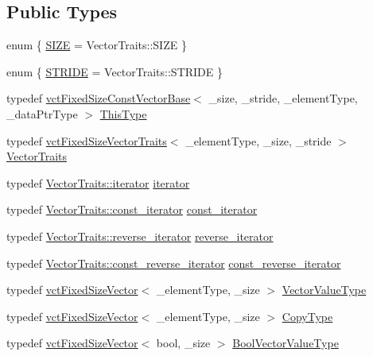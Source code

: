 \subsection*{Public Types}
\begin{DoxyCompactItemize}
\item 
enum \{ \hyperlink{classvct_fixed_size_const_vector_base_abce8a0d5a26d7343df60ea28ccf38626ac440f88d775ff77d03e1a484a213dcfe}{S\+I\+Z\+E} = Vector\+Traits\+:\+:S\+I\+Z\+E
 \}
\item 
enum \{ \hyperlink{classvct_fixed_size_const_vector_base_a8b833ecc64bf9196c1a89a56d6f11ebbaddc2fa94f972a3bf4df3a35bec4bdc48}{S\+T\+R\+I\+D\+E} = Vector\+Traits\+:\+:S\+T\+R\+I\+D\+E
 \}
\item 
typedef \hyperlink{classvct_fixed_size_const_vector_base}{vct\+Fixed\+Size\+Const\+Vector\+Base}$<$ \+\_\+size, \+\_\+stride, \+\_\+element\+Type, \+\_\+data\+Ptr\+Type $>$ \hyperlink{classvct_fixed_size_const_vector_base_a071063bc4fa43112cc287b2dbef53180}{This\+Type}
\item 
typedef \hyperlink{classvct_fixed_size_vector_traits}{vct\+Fixed\+Size\+Vector\+Traits}$<$ \+\_\+element\+Type, \+\_\+size, \+\_\+stride $>$ \hyperlink{classvct_fixed_size_const_vector_base_ac47f6db624303dee621bca2ec51aa75e}{Vector\+Traits}
\item 
typedef \hyperlink{classvct_fixed_size_vector_traits_a4c4cff693ac7f81edfb240a208506309}{Vector\+Traits\+::iterator} \hyperlink{classvct_fixed_size_const_vector_base_ad0ba9b13bb2515695b4e44290bdbaa5d}{iterator}
\item 
typedef \hyperlink{classvct_fixed_size_vector_traits_a9c7e38590e4a27350095e89a84dc0d09}{Vector\+Traits\+::const\+\_\+iterator} \hyperlink{classvct_fixed_size_const_vector_base_abc547e0542bb6f7d92876a56c7ea5cdc}{const\+\_\+iterator}
\item 
typedef \hyperlink{classvct_fixed_size_vector_traits_a46a61657ee7bece7277e0b59c4e0ea41}{Vector\+Traits\+::reverse\+\_\+iterator} \hyperlink{classvct_fixed_size_const_vector_base_ae22e8ced509e202d00620f384ac3a5b2}{reverse\+\_\+iterator}
\item 
typedef \hyperlink{classvct_fixed_size_vector_traits_a66365350e5fae26c9cf29a3ce0bb4a60}{Vector\+Traits\+::const\+\_\+reverse\+\_\+iterator} \hyperlink{classvct_fixed_size_const_vector_base_acd0a5fe64ff3551c45cebfb2ba81cf10}{const\+\_\+reverse\+\_\+iterator}
\item 
typedef \hyperlink{classvct_fixed_size_vector}{vct\+Fixed\+Size\+Vector}$<$ \+\_\+element\+Type, \+\_\+size $>$ \hyperlink{classvct_fixed_size_const_vector_base_a4de94a741a6bb9046e05754c32475ecd}{Vector\+Value\+Type}
\item 
typedef \hyperlink{classvct_fixed_size_vector}{vct\+Fixed\+Size\+Vector}$<$ \+\_\+element\+Type, \+\_\+size $>$ \hyperlink{classvct_fixed_size_const_vector_base_aaf3accb7cec5765478b5d8fa39c22408}{Copy\+Type}
\item 
typedef \hyperlink{classvct_fixed_size_vector}{vct\+Fixed\+Size\+Vector}$<$ bool, \+\_\+size $>$ \hyperlink{classvct_fixed_size_const_vector_base_a15899465a75a2f78965bdcf2d6e34bc5}{Bool\+Vector\+Value\+Type}
\end{DoxyCompactItemize}
